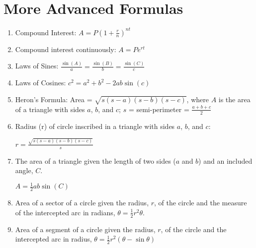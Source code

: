\documentclass[../uilmath.tex]{subfiles}
\begin{document}
\section*{More Advanced Formulas}
\begin{enumerate}
    \item Compound Interest: $A = P\left(1+\frac{r}{n}\right)^{nt}$
    \item Compound interest continuously: $A = Pe^{rt}$
    \item Laws of Sines: $\frac{\sin (A)}{a} = \frac{\sin(B)}{b} = \frac{\sin(C)}{c}$
    \item Laws of Cosines: $c^2=a^2+b^2-2ab \sin(c)$
    \item Heron's Formula: Area = $\sqrt{s(s-a)(s-b)(s-c)}$, where $A$ is the area of a triangle with sides $a$, $b$, and $c$; $s$ = semi-perimeter = $\frac{a+b+c}{2}$
    \item Radius (r) of circle inscribed in a triangle with sides $a$, $b$, and $c$:
    
    $r=\frac{\sqrt{s(s-a)(s-b)(s-c)}}{s}$

    \item The area of a triangle given the length of two sides ($a$ and $b$) and an included angle, $C$.
    
    $A = \frac{1}{2}ab\sin(C)$

    \item Area of a sector of a circle given the radius, $r$, of the circle and the measure of the intercepted arc in radians, $\theta = \frac{1}{2}r^2\theta$.
    \item Area of a segment of a circle given the radius, $r$, of the circle and the intercepted arc in radius, $\theta = \frac{1}{2}r^2(\theta - \sin\theta)$
\end{enumerate}
\end{document}
